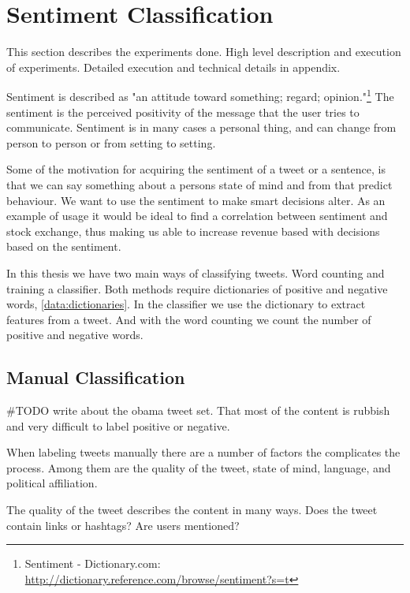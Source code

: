 
\chapter{Sentiment Classification}
This section describes the experiments done. High level description and
execution of experiments. Detailed execution and technical details in appendix. 

Sentiment is described as "an attitude toward something; regard; opinion."\footnote{Sentiment - Dictionary.com: \url{http://dictionary.reference.com/browse/sentiment?s=t}}
The sentiment is the perceived positivity of the message that the user tries to
communicate. Sentiment is in many cases a personal thing, and can change from
person to person or from setting to setting.  

Some of the motivation for acquiring the sentiment of a tweet or a sentence, is
that we can say something about a persons state of mind and from that predict
behaviour. We want to use the sentiment to make smart decisions alter. As an
example of usage it would be ideal to find a correlation between sentiment and
stock exchange, thus making us able to increase revenue based with decisions
based on the sentiment. 

In this thesis we have two main ways of classifying tweets. Word counting and
training a classifier. Both methods require dictionaries of positive and
negative words, \ref{data:dictionaries}. In the classifier we use the dictionary
to extract features from a tweet. And with the word counting we count the
number of positive and negative words. 

\section{Manual Classification}\label{sentiment:manual_classification}
#TODO write about the obama tweet set. That most of the content is rubbish and
very difficult to label positive or negative.

When labeling tweets manually there are a number of factors the complicates the
process. Among them are the quality of the tweet, state of mind, language, and
political affiliation.

The quality of the tweet describes the content in many ways. Does the tweet
contain links or hashtags? Are users mentioned?

